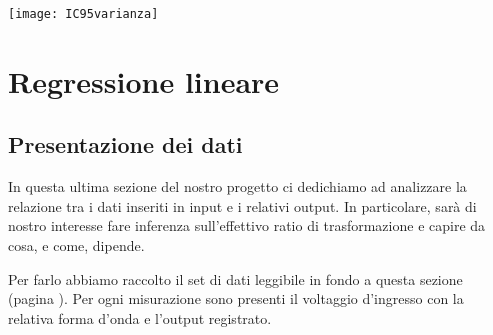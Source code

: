 \documentclass[a4paper]{article}
\begin{document}
	\begin{center}
		
		\texttt{[image: IC95varianza]} 
		
	\end{center}
	
																
																



	\section{Regressione lineare}
	\subsection{Presentazione dei dati}
	In questa ultima sezione del nostro progetto ci dedichiamo ad analizzare la relazione tra i dati inseriti in input e i relativi output. In particolare, sarà di nostro interesse fare inferenza sull’effettivo ratio di trasformazione e capire da cosa, e come, dipende. 
	
	Per farlo abbiamo raccolto il set di dati leggibile in fondo a questa sezione (pagina \pageref{set2}). Per ogni misurazione sono presenti il voltaggio d’ingresso con la relativa forma d’onda e l’output registrato.
	
\end{document}
